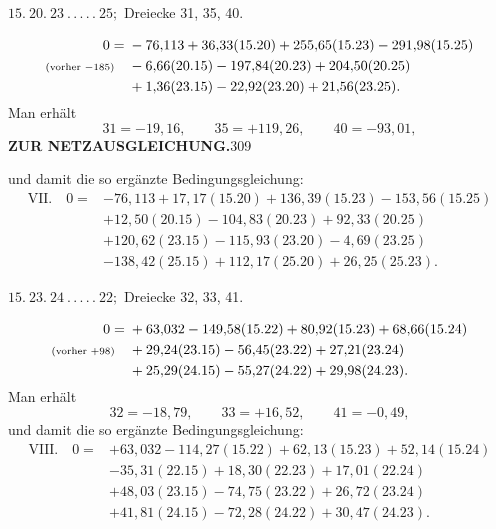 \par\bigskip
\begin{center}
$15.\ 20.\ 23\ .\,.\,.\,.\,.\ 25;$ Dreiecke 31, 35, 40.
\end{center}
\[
\begin{aligned}
0={}&-76{,}113+36{,}33(15.20)+255{,}65(15.23)-291{,}98(15.25)\\
\text{\scriptsize(vorher $-185$)}\quad&-6{,}66(20.15)-197{,}84(20.23)+204{,}50(20.25)\\
&+1{,}36(23.15)-22{,}92(23.20)+21{,}56(23.25).
\end{aligned}
\]
Man erhält
\[
31=-19{,}16,\qquad35=+119{,}26,\qquad40=-93{,}01,
\]
\newpage
\noindent\textbf{ZUR NETZAUSGLEICHUNG.}\hfill309\par\medskip
\noindent und damit die so ergänzte Bedingungsgleichung:
\[
\begin{aligned}
\mathrm{VII.}\quad0={}&-76{,}113+17{,}17(15.20)+136{,}39(15.23)-153{,}56(15.25)\\
&+12{,}50(20.15)-104{,}83(20.23)+92{,}33(20.25)\\
&+120{,}62(23.15)-115{,}93(23.20)-4{,}69(23.25)\\
&-138{,}42(25.15)+112{,}17(25.20)+26{,}25(25.23).
\end{aligned}
\]

\par\bigskip
\begin{center}
$15.\ 23.\ 24\ .\,.\,.\,.\,.\ 22;$ Dreiecke 32, 33, 41.
\end{center}
\[
\begin{aligned}
0={}&+63{,}032-149{,}58(15.22)+80{,}92(15.23)+68{,}66(15.24)\\
\text{\scriptsize(vorher $+98$)}\quad&+29{,}24(23.15)-56{,}45(23.22)+27{,}21(23.24)\\
&+25{,}29(24.15)-55{,}27(24.22)+29{,}98(24.23).
\end{aligned}
\]
Man erhält
\[
32=-18{,}79,\qquad33=+16{,}52,\qquad41=-0{,}49,
\]
und damit die so ergänzte Bedingungsgleichung:
\[
\begin{aligned}
\mathrm{VIII.}\quad0={}&+63{,}032-114{,}27(15.22)+62{,}13(15.23)+52{,}14(15.24)\\
&-35{,}31(22.15)+18{,}30(22.23)+17{,}01(22.24)\\
&+48{,}03(23.15)-74{,}75(23.22)+26{,}72(23.24)\\
&+41{,}81(24.15)-72{,}28(24.22)+30{,}47(24.23).
\end{aligned}
\]

